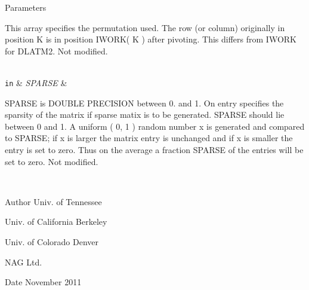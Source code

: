 \begin{DoxyParams}[1]{Parameters}
\begin{DoxyVerb}
           This array specifies the permutation used. The
           row (or column) originally in position K is in
           position IWORK( K ) after pivoting.
           This differs from IWORK for DLATM2. Not modified.\end{DoxyVerb}
\\
\hline
\mbox{\tt in}  & {\em S\+P\+A\+R\+S\+E} & \begin{DoxyVerb}          SPARSE is DOUBLE PRECISION between 0. and 1.
           On entry specifies the sparsity of the matrix
           if sparse matix is to be generated.
           SPARSE should lie between 0 and 1.
           A uniform ( 0, 1 ) random number x is generated and
           compared to SPARSE; if x is larger the matrix entry
           is unchanged and if x is smaller the entry is set
           to zero. Thus on the average a fraction SPARSE of the
           entries will be set to zero.
           Not modified.\end{DoxyVerb}
 \\
\hline
\end{DoxyParams}
\begin{DoxyAuthor}{Author}
Univ. of Tennessee 

Univ. of California Berkeley 

Univ. of Colorado Denver 

N\+A\+G Ltd. 
\end{DoxyAuthor}
\begin{DoxyDate}{Date}
November 2011 
\end{DoxyDate}
\hypertarget{group__double__matgen_ga13322803aa9677dfd46544b0d9fadf00}{}
